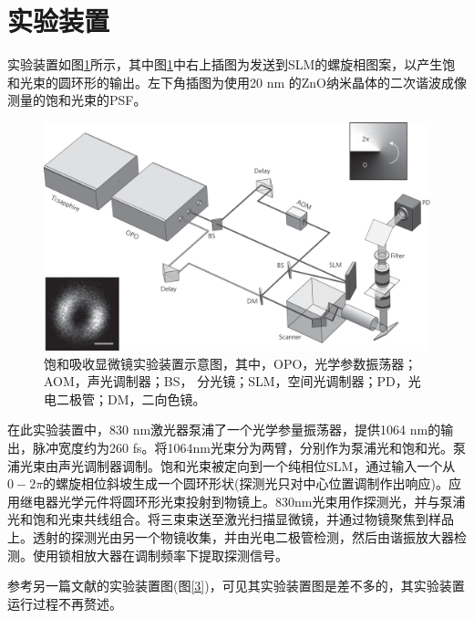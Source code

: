 \documentclass{phyasgn}\usepackage{nag}
\begin{document}
\section{实验装置}
实验装置如图\ref{2}所示，其中图\ref{2}中右上插图为发送到SLM的螺旋相图案，以产生饱和光束的圆环形的输出。左下角插图为使用20 nm 的ZnO纳米晶体的二次谐波成像测量的饱和光束的PSF。
\begin{figure}[!h]
	\centering
	\includegraphics[width=.95\linewidth]{pic/2.png}
	\caption[饱和吸收显微镜原理]{饱和吸收显微镜实验装置示意图\cite{wang2013far}，其中，OPO，光学参数振荡器；AOM，声光调制器；BS， 分光镜；SLM，空间光调制器；PD，光电二极管；DM，二向色镜。}\vspace{1ex}
	\label{2}
	\end{figure}
    \par 在此实验装置中，830 nm激光器泵浦了一个光学参量振荡器，提供1064 nm的输出，脉冲宽度约为260 fs。将1064nm光束分为两臂，分别作为泵浦光和饱和光。泵浦光束由声光调制器调制。饱和光束被定向到一个纯相位SLM，通过输入一个从$0-2\pi$的螺旋相位斜坡生成一个圆环形状(探测光只对中心位置调制作出响应)。应用继电器光学元件将圆环形光束投射到物镜上。830nm光束用作探测光，并与泵浦光和饱和光束共线组合。将三束束送至激光扫描显微镜，并通过物镜聚焦到样品上。透射的探测光由另一个物镜收集，并由光电二极管检测，然后由谐振放大器检测。使用锁相放大器在调制频率下提取探测信号。
    \par 参考另一篇文献\cite{doi:10.1021/acs.nanolett.1c00403}的实验装置图(图\ref{3})，可见其实验装置图是差不多的，其实验装置运行过程不再赘述。
\end{document}
